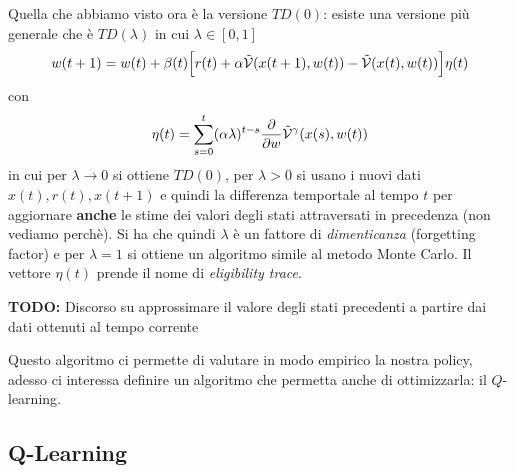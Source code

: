 Quella che abbiamo visto ora \`e la versione $TD(0)$: esiste una versione pi\`u generale che \`e $TD(\lambda)$ in cui $\lambda \in [0,1]$
\begin{equation}
w(t+1) = w(t) + \beta(t) \Big [ r(t) + \alpha \tilde{\mathcal{V}} (x(t+1), w(t)) - \tilde{\mathcal{V}}(x(t),w(t)) \Big] \eta(t)
\end{equation} con 
\begin{equation}
\eta (t) = \sum_{s=0}^t (\alpha \lambda)^{t-s} \frac{\partial}{\partial w} \tilde{\mathcal{V}}^\gamma (x(s), w(t))
\end{equation} in cui per $\lambda \to 0$ si ottiene $TD(0)$, per $\lambda > 0$ si usano i nuovi dati $x(t), r(t), x(t+1)$ e quindi la differenza temportale al tempo $t$ per aggiornare \textbf{anche} le stime dei valori degli stati attraversati in precedenza (non vediamo perch\`e). Si ha che quindi $\lambda$ \`e un fattore di \textit{dimenticanza} (forgetting factor) e per $\lambda = 1$ si ottiene un algoritmo simile al metodo Monte Carlo. Il vettore $\eta(t)$ prende il nome di \textit{eligibility trace}.

\textbf{TODO:} Discorso su approssimare il valore degli stati precedenti a partire dai dati ottenuti al tempo corrente

Questo algoritmo ci permette di valutare in modo empirico la nostra policy, adesso ci interessa definire un algoritmo che permetta anche di ottimizzarla: il $Q$-learning.

\subsection{Q-Learning}
